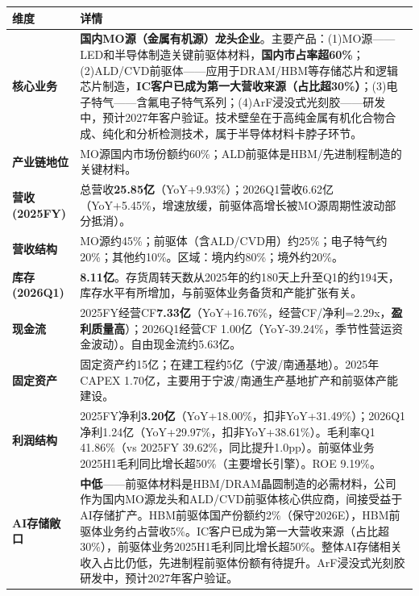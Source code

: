 \begin{exhibitbox}
\centering
\scriptsize
\renewcommand{\arraystretch}{1.20}
\begin{tabularx}{\exhibitboxwidth}{>{\bfseries}p{2.2cm} >{\raggedright\arraybackslash\sloppy\hspace{0pt}}X}
\toprule
\textbf{维度} & \textbf{详情} \\
\midrule
核心业务 & \textbf{国内MO源（金属有机源）龙头企业}。主要产品：(1)MO源——LED和半导体制造关键前驱体材料，\textbf{国内市占率超60\%}；(2)ALD/CVD前驱体——应用于DRAM/HBM等存储芯片和逻辑芯片制造，\textbf{IC客户已成为第一大营收来源（占比超30\%）}；(3)电子特气——含氟电子特气系列；(4)ArF浸没式光刻胶——研发中，预计2027年客户验证。技术壁垒在于高纯金属有机化合物合成、纯化和分析检测技术，属于半导体材料卡脖子环节。 \\
产业链地位 & MO源国内市场份额约60\%；ALD前驱体是HBM/先进制程制造的关键材料。 \\
营收(2025FY) & 总营收\textbf{25.85亿}（YoY+9.93\%）；2026Q1营收6.62亿（YoY+5.45\%，增速放缓，前驱体高增长被MO源周期性波动部分抵消）。 \\
营收结构 & MO源约45\%；前驱体（含ALD/CVD用）约25\%；电子特气约20\%；其他约10\%。区域：境内约80\%；境外约20\%。 \\
库存(2026Q1) & \textbf{8.11亿}。存货周转天数从2025年的约180天上升至Q1的约194天，库存水平有所增加，与前驱体业务备货和产能扩张有关。 \\
现金流 & 2025FY经营CF\textbf{7.33亿}（YoY+16.76\%，经营CF/净利=2.29x，\textbf{盈利质量高}）；2026Q1经营CF 1.00亿（YoY-39.24\%，季节性营运资金波动）。自由现金流约5.63亿。 \\
固定资产 & 固定资产约15亿；在建工程约5亿（宁波/南通基地）。2025年CAPEX 1.70亿，主要用于宁波/南通生产基地扩产和前驱体产能建设。 \\
利润结构 & 2025FY净利\textbf{3.20亿}（YoY+18.00\%，扣非YoY+31.49\%）；2026Q1净利1.24亿（YoY+29.97\%，扣非YoY+38.61\%）。毛利率Q1 41.86\%（vs 2025FY 39.62\%，同比提升1.0pp）。前驱体业务2025H1毛利同比增长超50\%（主要增长引擎）。ROE 9.19\%。 \\
AI存储敞口 & \textbf{中低}——前驱体材料是HBM/DRAM晶圆制造的必需材料，公司作为国内MO源龙头和ALD/CVD前驱体核心供应商，间接受益于AI存储扩产。HBM前驱体国产份额约2\%（保守2026E），HBM前驱体业务约占营收5\%。IC客户已成为第一大营收来源（占比超30\%），前驱体业务2025H1毛利同比增长超50\%。整体AI存储相关收入占比仍低，先进制程前驱体份额有待提升。ArF浸没式光刻胶研发中，预计2027年客户验证。 \\
\bottomrule
\end{tabularx}
\end{exhibitbox}

